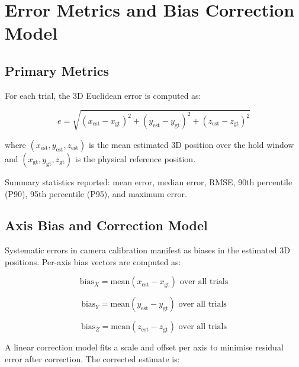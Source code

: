\section{Error Metrics and Bias Correction Model}

\subsection{Primary Metrics}

For each trial, the 3D Euclidean error is computed as:

\begin{equation}
e = \sqrt{(x_{\text{est}} - x_{\text{gt}})^2 + (y_{\text{est}} - y_{\text{gt}})^2 + (z_{\text{est}} - z_{\text{gt}})^2}
\label{eqn:4_1_euclidean_error}
\end{equation}

where $(x_{\text{est}}, y_{\text{est}}, z_{\text{est}})$ is the mean estimated 3D position over the hold window and $(x_{\text{gt}}, y_{\text{gt}}, z_{\text{gt}})$ is the physical reference position.

Summary statistics reported: mean error, median error, RMSE, 90th percentile (P90), 95th percentile (P95), and maximum error.

\subsection{Axis Bias and Correction Model}

Systematic errors in camera calibration manifest as biases in the estimated 3D positions. Per-axis bias vectors are computed as:

\begin{equation}
\text{bias}_X = \text{mean}(x_{\text{est}} - x_{\text{gt}}) \text{ over all trials}
\label{eqn:4_2_bias_x}
\end{equation}

\begin{equation}
\text{bias}_Y = \text{mean}(y_{\text{est}} - y_{\text{gt}}) \text{ over all trials}
\label{eqn:4_3_bias_y}
\end{equation}

\begin{equation}
\text{bias}_Z = \text{mean}(z_{\text{est}} - z_{\text{gt}}) \text{ over all trials}
\label{eqn:4_4_bias_z}
\end{equation}

A linear correction model fits a scale and offset per axis to minimise residual error after correction. The corrected estimate is:

